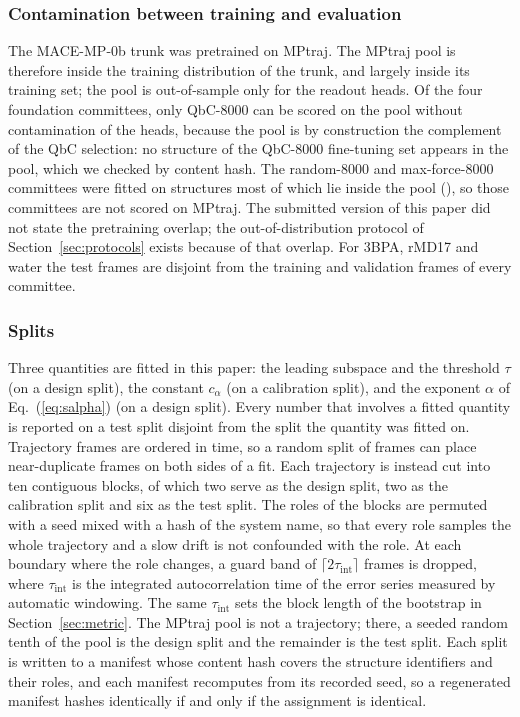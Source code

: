\subsubsection{Contamination between training and evaluation}

The MACE-MP-0b trunk was pretrained on MPtraj. The MPtraj pool is therefore
inside the training distribution of the trunk, and largely inside its training
set; the pool is out-of-sample only for the readout heads. Of the four
foundation committees, only QbC-8000 can be scored on the pool without
contamination of the heads, because the pool is by construction the complement
of the QbC selection: no structure of the QbC-8000 fine-tuning set appears in
the pool, which we checked by content hash. The random-8000 and max-force-8000
committees were fitted on structures most of which lie inside the pool
(), so those
committees are not scored on MPtraj. The submitted version of this paper did
not state the pretraining overlap; the out-of-distribution protocol of
Section~\ref{sec:protocols} exists because of that overlap. For 3BPA, rMD17
and water the test frames are disjoint from the training and validation frames
of every committee.

\subsubsection{Splits}

Three quantities are fitted in this paper: the leading subspace and the
threshold $\tau$ (on a design split), the constant $c_\alpha$ (on a calibration
split), and the exponent $\alpha$ of Eq.~(\ref{eq:salpha}) (on a design
split). Every number that involves a fitted quantity is reported on a test
split disjoint from the split the quantity was fitted on. Trajectory frames
are ordered in time, so a random split of frames can place near-duplicate
frames on both sides of a fit. Each trajectory is instead cut into ten
contiguous blocks, of which two serve as the design split, two as the
calibration split and six as the test split. The roles of the blocks are
permuted with a seed mixed with a hash of the system name, so that every role
samples the whole trajectory and a slow drift is not confounded with the role.
At each boundary where the role changes, a guard band of
$\lceil 2\tau_{\mathrm{int}}\rceil$ frames is dropped, where
$\tau_{\mathrm{int}}$ is the integrated autocorrelation time of the error
series measured by automatic windowing. The same $\tau_{\mathrm{int}}$ sets
the block length of the bootstrap in Section~\ref{sec:metric}. The MPtraj pool
is not a trajectory; there, a seeded random tenth of the pool is the design
split and the remainder is the test split. Each split is written to a manifest
whose content hash covers the structure identifiers and their roles, and each
manifest recomputes from its recorded seed, so a regenerated manifest hashes
identically if and only if the assignment is identical.

